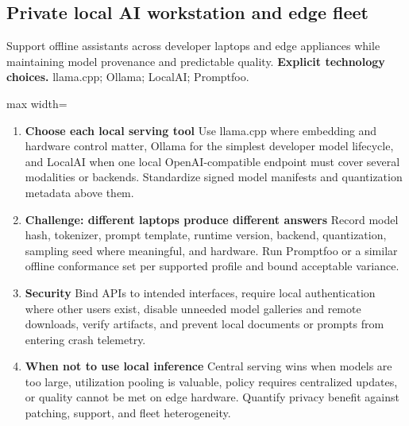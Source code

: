 \subsection{Private local AI workstation and edge fleet}
Support offline assistants across developer laptops and edge appliances while maintaining model provenance and predictable quality.
\textbf{Explicit technology choices.} llama.cpp; Ollama; LocalAI; Promptfoo.
\begin{center}\begin{adjustbox}{max width=\linewidth}\end{adjustbox}\end{center}
\begin{enumerate}
\item \textbf{Choose each local serving tool} Use llama.cpp where embedding and hardware control matter, Ollama for the simplest developer model lifecycle, and LocalAI when one local OpenAI-compatible endpoint must cover several modalities or backends. Standardize signed model manifests and quantization metadata above them.
\item \textbf{Challenge: different laptops produce different answers} Record model hash, tokenizer, prompt template, runtime version, backend, quantization, sampling seed where meaningful, and hardware. Run Promptfoo or a similar offline conformance set per supported profile and bound acceptable variance.
\item \textbf{Security} Bind APIs to intended interfaces, require local authentication where other users exist, disable unneeded model galleries and remote downloads, verify artifacts, and prevent local documents or prompts from entering crash telemetry.
\item \textbf{When not to use local inference} Central serving wins when models are too large, utilization pooling is valuable, policy requires centralized updates, or quality cannot be met on edge hardware. Quantify privacy benefit against patching, support, and fleet heterogeneity.
\end{enumerate}
